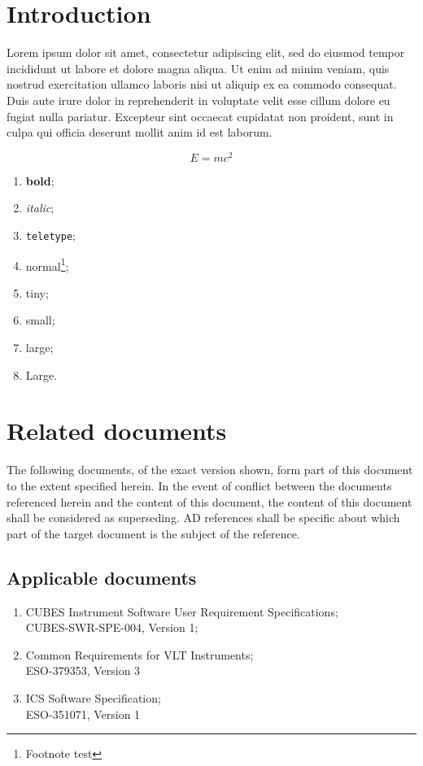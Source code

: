 \documentclass[12pt,a4paper]{report}
\newenvironment{ADlist}
               {\begin{enumerate}[start=1,label={\bfseries AD\arabic*}]}
               {\end{enumerate}}
\newcommand{\ARDitem}[2]{\item \label{#1} {#2}}
\begin{document}
\newpage


\tableofcontents

\newpage

\chapter{Introduction}

Lorem ipsum dolor sit amet, consectetur adipiscing elit, sed do eiusmod tempor incididunt ut labore et dolore magna aliqua. Ut enim ad minim veniam, quis nostrud exercitation ullamco laboris nisi ut aliquip ex ea commodo consequat. Duis aute irure dolor in reprehenderit in voluptate velit esse cillum dolore eu fugiat nulla pariatur. Excepteur sint occaecat cupidatat non proident, sunt in culpa qui officia deserunt mollit anim id est laborum.


\begin{equation}
  \label{eq:eq}
  E = mc^2
\end{equation}

\begin{enumerate}
\item {\bf bold};
\item {\it italic};
\item {\tt teletype};
\item normal\footnote{Footnote test};
\item {\tiny tiny};
\item {\small small};
\item {\large large};
\item {\Large Large}.
\end{enumerate}


\chapter{Related documents}

The following documents, of the exact version shown, form part of this document to the extent specified herein. In the event of conflict between the documents referenced herein and the content of this document, the content of this document shall be considered as superseding.  AD references shall be specific about which part of the target document is the subject of the reference.

\section{Applicable documents}
\begin{ADlist}
  \ARDitem{AD:ISURS}{CUBES Instrument Software User Requirement Specifications;\\CUBES-SWR-SPE-004, Version 1;}
  \ARDitem{AD:ESO-379353}{Common Requirements for VLT Instruments;\\ESO-379353, Version 3}
  \ARDitem{AD:ESO-351071}{ICS Software Specification;\\ESO-351071, Version 1}
\end{ADlist}
\end{document}

